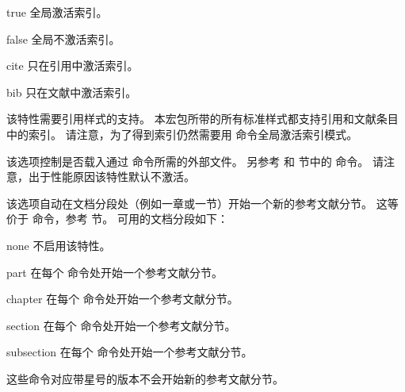\begin{optionlist}
\begin{valuelist}
\item[true] %
全局激活索引。
\item[false] %
全局不激活索引。
\item[cite] %
只在引用中激活索引。
\item[bib] %
只在文献中激活索引。
\end{valuelist}


该特性需要引用样式的支持。
本宏包所带的所有标准样式都支持引用和文献条目中的索引。
请注意，为了得到索引仍然需要用  命令全局激活索引模式。



该选项控制是否载入通过  命令所需的外部文件。
另参考  和  节中的  命令。
请注意，出于性能原因该特性默认不激活。



该选项自动在文档分段处（例如一章或一节）开始一个新的参考文献分节。
这等价于  命令，参考  节。
可用的文档分段如下：

\begin{valuelist}
\item[none] %
不启用该特性。
\item[part] %
在每个  命令处开始一个参考文献分节。
\item[chapter] %
在每个  命令处开始一个参考文献分节。
\item[section] %
在每个  命令处开始一个参考文献分节。
\item[subsection] %
在每个  命令处开始一个参考文献分节。
\end{valuelist}
%
这些命令对应带星号的版本不会开始新的参考文献分节。


\end{optionlist}
